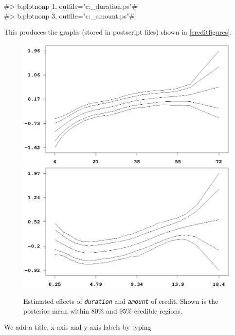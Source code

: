 #> b.plotnonp 1, outfile="c:\results\credit_duration.ps"#\\
#> b.plotnonp 3, outfile="c:\results\credit_amount.ps"#

This produces the graphs (stored in postscript files) shown in
\autoref{creditfigures}.

\begin{figure}[ht]
\vspace{0.5cm}
\begin{center}
\includegraphics[scale=0.65]{grafiken/credit_duration.ps}

\vspace{0.5cm}
\includegraphics[scale=0.65]{grafiken/credit_amount.ps}
\end{center}
{\em\caption{ \label{creditfigures} Estimated effects of {\em\tt duration}
and {\em\tt amount} of credit. Shown is the posterior mean within 80\% and
95\% credible regions.}}
\end{figure}

We add a title, x-axis and y-axis labels by typing \hfill

